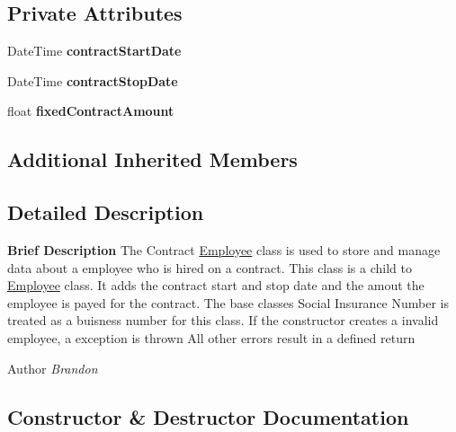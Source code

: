 \subsection*{Private Attributes}
\begin{DoxyCompactItemize}
\item 
\hypertarget{class_all_employees_1_1_contract_employee_aeef462cc8bd0639b674bba0632b6586b}{}Date\+Time {\bfseries contract\+Start\+Date}\label{class_all_employees_1_1_contract_employee_aeef462cc8bd0639b674bba0632b6586b}

\item 
\hypertarget{class_all_employees_1_1_contract_employee_ab549d2c8addad182fd66246c41ca73b7}{}Date\+Time {\bfseries contract\+Stop\+Date}\label{class_all_employees_1_1_contract_employee_ab549d2c8addad182fd66246c41ca73b7}

\item 
\hypertarget{class_all_employees_1_1_contract_employee_a81526f8517894ce466b70e3ffa61a8a8}{}float {\bfseries fixed\+Contract\+Amount}\label{class_all_employees_1_1_contract_employee_a81526f8517894ce466b70e3ffa61a8a8}

\end{DoxyCompactItemize}
\subsection*{Additional Inherited Members}


\subsection{Detailed Description}
{\bfseries Brief Description} The Contract \hyperlink{class_all_employees_1_1_employee}{Employee} class is used to store and manage data about a employee who is hired on a contract. This class is a child to \hyperlink{class_all_employees_1_1_employee}{Employee} class. It adds the contract start and stop date and the amout the employee is payed for the contract. The base classes Social Insurance Number is treated as a buisness number for this class. If the constructor creates a invalid employee, a exception is thrown All other errors result in a defined return 

\begin{DoxyAuthor}{Author}
{\itshape Brandon} 
\end{DoxyAuthor}


\subsection{Constructor \& Destructor Documentation}
\hypertarget{class_all_employees_1_1_contract_employee_afb78892e913ff2a34aed4d7b78d6c9f7}{}
